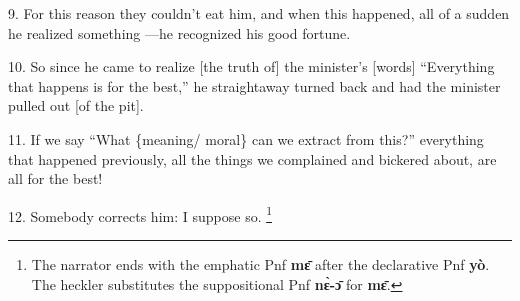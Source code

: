 9. For this reason they couldn't eat him, and when this happened, all of a sudden
he realized something ---he recognized his good fortune.

10. So since he came to realize [the truth of] the minister's [words] ``Everything
that happens is for the best,'' he straightaway turned back and had the minister
pulled out [of the pit].

11. If we say ``What \{meaning/ moral\} can we extract from this?'' everything
that happened previously, all the things we complained and bickered about, are
all for the best!

12. Somebody corrects him: I suppose so. \footnote{The narrator ends with the emphatic Pnf \textbf{mɛ̄} after the declarative Pnf \textbf{yò}. The heckler substitutes the suppositional Pnf \textbf{nɛ̀-ɔ̄ }for \textbf{mɛ̄}.}


